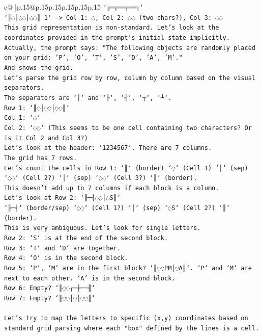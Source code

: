\documentclass{article}
\begin{document}
{\begin{supertabular}{c@{$\;$}|p{.15\linewidth}@{}p{.15\linewidth}p{.15\linewidth}p{.15\linewidth}p{.15\linewidth}p{.15\linewidth}}
{{{\texttt{`╔═╤══╤══╗`} \\
\texttt{`║◌│◌◌│◌◌║ 1` {-}> Col 1: ◌, Col 2: ◌◌ (two chars?), Col 3: ◌◌} \\
\texttt{This grid representation is non{-}standard. Let's look at the coordinates provided in the prompt's initial state implicitly.} \\
\texttt{Actually, the prompt says: "The following objects are randomly placed on your grid: 'P', 'O', 'T', 'S', 'D', 'A', 'M'."} \\
\texttt{And shows the grid.} \\
\texttt{Let's parse the grid row by row, column by column based on the visual separators.} \\
\texttt{The separators are `│` and `├`, `┤`, `┬`, `┴`.} \\
\texttt{Row 1: `║◌│◌◌│◌◌║`} \\
\texttt{Col 1: `◌`} \\
\texttt{Col 2: `◌◌` (This seems to be one cell containing two characters? Or is it Col 2 and Col 3?)} \\
\texttt{Let's look at the header: `1234567`. There are 7 columns.} \\
\texttt{The grid has 7 rows.} \\
\texttt{Let's count the cells in Row 1: `║` (border) `◌` (Cell 1) `│` (sep) `◌◌` (Cell 2?) `│` (sep) `◌◌` (Cell 3?) `║` (border).} \\
\texttt{This doesn't add up to 7 columns if each block is a column.} \\
\texttt{Let's look at Row 2: `╟─┤◌◌│◌S║`} \\
\texttt{`╟─┤` (border/sep) `◌◌` (Cell 1?) `│` (sep) `◌S` (Cell 2?) `║` (border).} \\
\texttt{This is very ambiguous. Let's look for single letters.} \\
\texttt{Row 2: `S` is at the end of the second block.} \\
\texttt{Row 3: `T` and `D` are together.} \\
\texttt{Row 4: `O` is in the second block.} \\
\texttt{Row 5: `P`, `M` are in the first block? `║◌◌PM│◌A║`. `P` and `M` are next to each other. `A` is in the second block.} \\
\texttt{Row 6: Empty? `║◌◌┌─┼──╢`} \\
\texttt{Row 7: Empty? `║◌◌│◌│◌◌║`} \\
\\ 
\texttt{Let's try to map the letters to specific (x,y) coordinates based on standard grid parsing where each "box" defined by the lines is a cell.} \\
}}}
\end{supertabular}}
\end{document}
